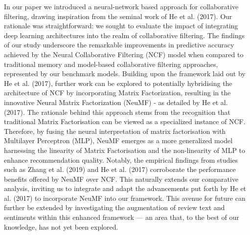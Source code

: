 In our paper we introduced a neural-network based approach for collaborative filtering, drawing inspiration from the seminal work of He et al. (2017). Our rationale was straightforward: we sought to evaluate the impact of integrating deep learning architectures into the realm of collaborative filtering. The findings of our study  underscore the remarkable improvements in predictive accuracy achieved by the Neural Collaborative Filtering (NCF) model when compared to traditional memory and model-based collaborative filtering approaches, represented by our benchmark models. Building upon the framework laid out by He et al. (2017), further work can be explored to potentially hybridising the architecture of NCF by incorporating Matrix Factorization, resulting in the innovative Neural Matrix Factorization (NeuMF) - as detailed by He et al. (2017). The rationale behind this approach stems from the recognition that traditional Matrix Factorisation can be viewed as a specialized instance of NCF. Therefore, by fusing the neural interpretation of matrix factorisation with Multilayer Perceptron (MLP), NeuMF emerges as a more generalized model harnessing the linearity of Matrix Factorisation and the non-linearity of MLP to enhance recommendation quality. Notably, the empirical findings from studies such as Zhang et al. (2019) and He et al. (2017) corroborate the performance benefits offered by NeuMF over NCF. This naturally extends our comparative analysis, inviting us to integrate and adapt the advancements put forth by He et al. (2017) to incorporate NeuMF into our framework. This avenue for future can further be extended by investigating the augmentation of review text and sentiments within this enhanced framework — an area that, to the best of our knowledge, has not yet been explored. 


